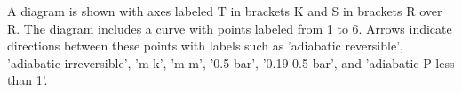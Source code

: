 A diagram is shown with axes labeled T in brackets K and S in brackets R over R. The diagram includes a curve with points labeled from 1 to 6. Arrows indicate directions between these points with labels such as 'adiabatic reversible', 'adiabatic irreversible', 'm k', 'm m', '0.5 bar', '0.19-0.5 bar', and 'adiabatic P less than 1'.